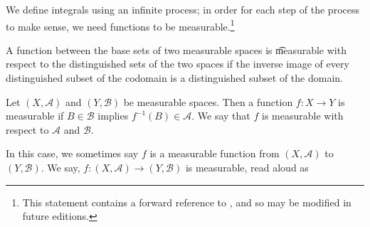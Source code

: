 

We define integrals using an infinite process; in order for each step of the process to make sense, we need functions to be measurable.\footnote{This statement contains a forward reference to , and so may be modified in future editions.}


A function between the base sets of two measurable spaces is
\t{measurable}
with respect to the distinguished
sets of the two spaces if the
inverse image of every
distinguished subset of the
codomain is a distinguished
subset of the domain.


Let $(X, \mathcal{A})$
and $(Y, \mathcal{B})$
be measurable spaces.
Then a function
$f: X \to Y$ is measurable
if $B \in \mathcal{B}$
implies $f^{-1}(B) \in \mathcal{A}$.
We say that $f$ is measurable
with respect to $\mathcal{A}$ and
$\mathcal{B}$.

In this case, we sometimes say
$f$ is a measurable function
from $(X, \mathcal{A})$ to
$(Y, \mathcal{B})$.
We say,
$f: (X, \mathcal{A}) \to (Y, \mathcal{B})$
is measurable, read aloud as

